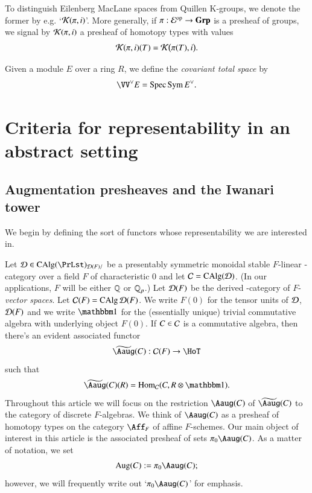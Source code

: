 To distinguish Eilenberg MacLane spaces from Quillen K-groups, we denote the former by e.g. `$\mathcal{K}(\pi,i)$'. More generally, if $\pi: \mathcal{E}^{\mathrm{op}} \to \mathbf{Grp}$ is a presheaf of groups, we signal by $\mathcal{K}(\pi,i)$ a presheaf of homotopy types with values
\[
\mathcal{K}(\pi,i)(T) = \mathcal{K}\big(\pi(T),i\big).
\]

Given a module $E$ over a ring $R$, we define the \emph{covariant total space} by 
\[
\VV^\lor E  = \Spec \Sym E^\lor.
\]



\section{Criteria for representability in an abstract setting}
\label{Sec:Rep}



\subsection{Augmentation presheaves and the Iwanari tower}
\label{sSec:AugPre}

We begin by defining the sort of functors whose representability we are interested in.

\label{BB33}
Let $\Dd \in \CAlg (\PrLst)_{\Dd(F)/}$ be a presentably symmetric monoidal stable $F$-linear \oo-category over a field $F$ of characteristic 0 and let $\mathcal{C} = \operatorname{CAlg}(\mathcal{D})$. (In our applications, $F$ will be either $\mathbb{Q}$ or ${\mathbb{Q}_p}$.) Let $\mathcal{D}(F)$ be the derived \oo-category of $F$-\textit{vector spaces}. Let $\mathcal{C}(F) = \operatorname{CAlg} \mathcal{D}(F)$. We write $F(0)$ for the tensor units of $\mathcal{D}$, $\mathcal{D}(F)$ and we write $\one$ for the (essentially unique) trivial commutative algebra with underlying object $F(0)$. If $C \in \mathcal{C}$ is a commutative algebra, then there's an evident associated functor 
\[
\widetilde{\Aaug}(C): 
\Cc(F) \to \HoT
\]
such that
\[
\widetilde{\Aaug}(C)(R) = 
\Hom_\Cc(C, R \otimes \one). 
\]
Throughout this article we will focus on the restriction  $\Aaug(C)$ of $\widetilde {\Aaug}(C)$ to the category of discrete $F$-algebras. We think of $\Aaug(C)$ as a presheaf of homotopy types on the category $\Aff_F$ of affine $F$-schemes. Our main object of interest in this article is the associated presheaf of sets $\pi_0 \Aaug(C)$. As a matter of notation, we set
\[
\Aug(C) := \pi_0 \Aaug(C);
\]
however, we will frequently write out `$ \pi_0 \Aaug(C)$' for emphasis. 

